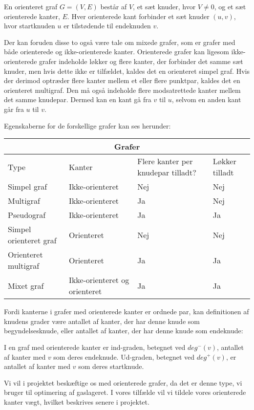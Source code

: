 \begin{defn}
En orienteret graf $G=(V,E)$ består af $V$, et sæt knuder, hvor $V\neq0$, og et sæt orienterede kanter, $E$. Hver orienterede kant forbinder et sæt knuder $(u,v)$, hvor startknuden $u$ er tilstødende til endeknuden $v$. 
\end{defn}





Der kan foruden disse to også være tale om mixede grafer, som er grafer med både orienterede og ikke-orienterede kanter. Orienterede grafer kan ligesom ikke-orienterede grafer indeholde løkker og flere kanter, der forbinder det samme sæt knuder, men hvis dette ikke er tilfældet, kaldes det en orienteret simpel graf. Hvis der derimod optræder flere kanter mellem et eller flere punktpar, kaldes det en orienteret multigraf. Den må også indeholde flere modsatrettede kanter mellem det samme knudepar. Dermed kan en kant gå fra $v$ til $u$, selvom en anden kant går fra $u$ til $v$. 

Egenskaberne for de forskellige grafer kan ses herunder:

\begin{tabular}{ |p{4cm}||p{3cm}|p{3cm}|p{2cm}|  }
 \hline
 \multicolumn{4}{|c|}{Grafer} \\
 \hline
 Type & Kanter & Flere kanter per knudepar tilladt? & Løkker tilladt\\
 \hline
 Simpel graf   & Ikke-orienteret    & Nej &   Nej\\
 Multigraf &   Ikke-orienteret & Ja   & Nej\\
 Pseudograf & Ikke-orienteret & Ja &  Ja\\
 Simpel orienteret graf    & Orienteret & Nej &  Nej\\
 Orienteret multigraf &  Orienteret  & Ja & Ja\\
 Mixet graf & Ikke-orienteret og orienteret  & Ja   & Ja\\
 \hline
\end{tabular}

Fordi kanterne i grafer med orienterede kanter er ordnede par, kan definitionen af knudens grader være antallet af kanter, der har denne knude som begyndelsesknude, eller antallet af kanter, der har denne knude som endeknude:
\begin{defn}
I en graf med orienterede kanter er ind-graden, betegnet ved $deg^{-}(v)$, antallet af kanter med $v$ som deres endeknude. Ud-graden, betegnet ved $deg^{+}(v)$, er antallet af kanter med $v$ som deres startknude.
\end{defn}
Vi vil i projektet beskæftige os med orienterede grafer, da det er denne type, vi bruger til optimering af gaslageret. I vores tilfælde vil vi tildele vores orienterede kanter vægt, hvilket beskrives senere i projektet.
